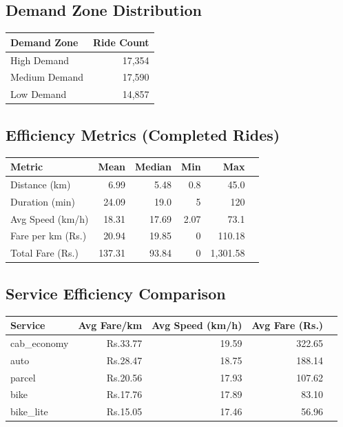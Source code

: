 \documentclass[12pt,a4paper]{article}
\begin{document}
\subsection{Demand Zone Distribution}
\begin{center}
\begin{tabular}{lr}
\toprule
\textbf{Demand Zone} & \textbf{Ride Count} \\
\midrule
High Demand & 17,354 \\
Medium Demand & 17,590 \\
Low Demand & 14,857 \\
\bottomrule
\end{tabular}
\end{center}

\subsection{Efficiency Metrics (Completed Rides)}
\begin{center}
\begin{tabular}{lrrrrr}
\toprule
\textbf{Metric} & \textbf{Mean} & \textbf{Median} & \textbf{Min} & \textbf{Max} \\
\midrule
Distance (km) & 6.99 & 5.48 & 0.8 & 45.0 \\
Duration (min) & 24.09 & 19.0 & 5 & 120 \\
Avg Speed (km/h) & 18.31 & 17.69 & 2.07 & 73.1 \\
Fare per km (Rs.) & 20.94 & 19.85 & 0 & 110.18 \\
Total Fare (Rs.) & 137.31 & 93.84 & 0 & 1,301.58 \\
\bottomrule
\end{tabular}
\end{center}

\subsection{Service Efficiency Comparison}
\begin{center}
\begin{tabular}{lrrrr}
\toprule
\textbf{Service} & \textbf{Avg Fare/km} & \textbf{Avg Speed (km/h)} & \textbf{Avg Fare (Rs.)} \\
\midrule
cab\_economy & Rs.33.77 & 19.59 & 322.65 \\
auto & Rs.28.47 & 18.75 & 188.14 \\
parcel & Rs.20.56 & 17.93 & 107.62 \\
bike & Rs.17.76 & 17.89 & 83.10 \\
bike\_lite & Rs.15.05 & 17.46 & 56.96 \\
\bottomrule
\end{tabular}
\end{center}
\end{document}
